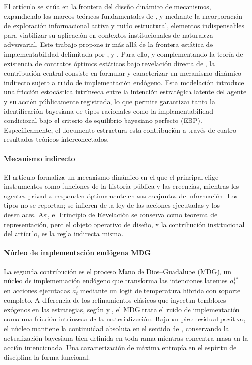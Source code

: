 \documentclass[review,authoryear,12pt]{elsarticle}
\theoremstyle{plain}
\theoremstyle{definition}
\newcommand{\1}{\mathbf{1}}
\begin{document}
El artículo se sitúa en la frontera del diseño dinámico de mecanismos, expandiendo los marcos teóricos fundamentales de \citet{CourtyLi2000}, \citet{EsoSzentes2007} y \citet{PavanSegalToikka2014} mediante la incorporación de exploración informacional activa y ruido estructural, elementos indispensables para viabilizar su aplicación en contextos institucionales de naturaleza adversarial. Este trabajo propone ir más allá de la frontera estática de implementabilidad delimitada por \citet{MyersonSatterthwaite1983}, \citet{Rochet1987} y \citet{RochetChone1998}. Para ello, y complementando la teoría de existencia de contratos óptimos estáticos bajo revelación directa de \citet{KadanRenySwinkels2017}, la contribución central consiste en formular y caracterizar un mecanismo dinámico indirecto sujeto a ruido de implementación endógeno. Esta modelación introduce una fricción estocástica intrínseca entre la intención estratégica latente del agente y su acción públicamente registrada, lo que permite garantizar tanto la identificación bayesiana de tipos racionales como la implementabilidad condicional bajo el criterio de equilibrio bayesiano perfecto (EBP). Específicamente, el documento estructura esta contribución a través de cuatro resultados teóricos interconectados.

\paragraph{Mecanismo indirecto}
El artículo formaliza un mecanismo dinámico en el que el principal elige instrumentos como funciones de la historia pública y las creencias, mientras los agentes privados responden óptimamente en sus conjuntos de información. Los tipos no se reportan; se infieren de la ley de las acciones ejecutadas y los desenlaces. Así, el Principio de Revelación se conserva como teorema de representación, pero el objeto operativo de diseño, y la contribución institucional del artículo, es la regla indirecta misma.

\paragraph{Núcleo de implementación endógena MDG}
La segunda contribución es el proceso Mano de Dios--Guadalupe (MDG), un núcleo de implementación endógeno que transforma las intenciones latentes $a_t^{i\ast}$ en acciones ejecutadas $\tilde a_t^i$ mediante un logit de temperatura híbrida con soporte completo. A diferencia de los refinamientos clásicos que inyectan temblores exógenos en las estrategias, según \citet{Selten1975Perfectness} y \citet{KrepsWilson1982}, el MDG trata el ruido de implementación como una fricción intrínseca de la materialización. Bajo un piso residual positivo, el núcleo mantiene la continuidad absoluta en el sentido de \citet{KalaiLehrer1993}, conservando la actualización bayesiana bien definida en toda rama mientras concentra masa en la acción intencionada. Una caracterización de máxima entropía en el espíritu de \citet{Jaynes1957Information} disciplina la forma funcional.
\end{document}

